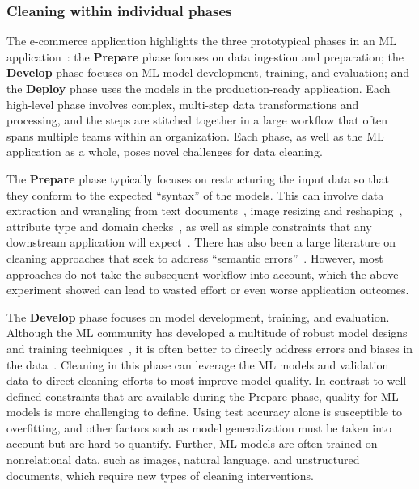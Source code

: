 \documentclass[11pt,dvipsnames]{article}
\begin{document}
\newpage%
\subsubsection{Cleaning within individual phases }

The e-commerce application highlights the three prototypical phases in an ML application~\cite{MLatFacebook, Tfx}: 
the \textbf{Prepare} phase focuses on data ingestion and preparation; the \textbf{Develop} phase focuses on ML model development, training, and evaluation;  and the \textbf{Deploy} phase uses the models in the production-ready application.  Each high-level phase involves complex, multi-step data transformations and processing, and the steps are stitched together in a large workflow that often spans multiple teams within an organization.  Each phase, as well as the ML application as a whole, poses novel challenges for data cleaning.

The \textbf{Prepare} phase typically focuses on restructuring the input data so that they conform to the expected ``syntax'' of the models.  This can involve data extraction and wrangling from text documents~\cite{datawrangler}, image resizing and reshaping~\cite{ImageAugmentor}, attribute type and domain checks~\cite{Deequ,Tfx}, as well as simple constraints that any downstream application will expect~\cite{DetectingDataErrors}. There has also been a large literature on cleaning approaches that seek to address ``semantic errors''~\cite{KATARA,NADEEF,HoloClean,HoloDetect,UniDetect,MetadataDriven,Raha,ED2,Baran}.   However, most approaches do not take the subsequent workflow into account, which the above experiment showed can lead to wasted effort or even worse application outcomes.

The \textbf{Develop} phase focuses on model development, training, and evaluation.  Although the ML community has developed a multitude of robust model designs and training techniques~\cite{robustML}, it is often better to directly address errors and biases in the data~\cite{CleanML}.  Cleaning in this phase can leverage the ML models and validation data to direct cleaning efforts to most improve model quality.  In contrast to well-defined constraints that are available during the Prepare phase, quality for ML models is more challenging to define.  Using test accuracy alone is susceptible to overfitting, and other factors such as model generalization must be taken into account but are hard to quantify.   Further, ML models are often trained on nonrelational data, such as images, natural language, and unstructured documents, which require new types of cleaning interventions.
\end{document}
